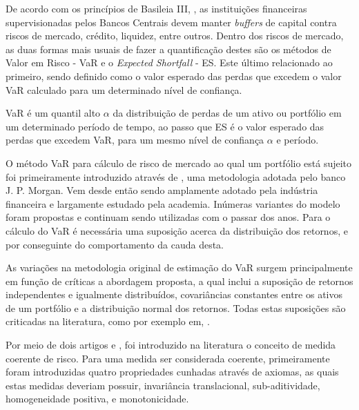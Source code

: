 \documentclass[1p]{elsarticle}
\theoremstyle{definition}
\begin{document}
De acordo com os princípios de Basileia III, \cite{BankingSupervision2011, BankingSupervision2013, BankingSupervision2014}, as instituições financeiras supervisionadas pelos Bancos Centrais devem manter \emph{buffers} de capital contra riscos de mercado, crédito, liquidez, entre outros. Dentro dos riscos de mercado, as duas formas mais usuais de fazer a quantificação destes são os métodos de Valor em Risco - VaR e o \emph{Expected Shortfall} - ES. Este último relacionado ao primeiro, sendo definido como o valor esperado das perdas que excedem o valor VaR calculado para um determinado nível de confiança.

VaR é um quantil alto $\alpha$ da distribuição de perdas de um ativo ou portfólio em um determinado período de tempo, ao passo que ES é o valor esperado das perdas que excedem VaR, para um mesmo nível de confiança $\alpha$ e período.

O método VaR para cálculo de risco de mercado ao qual um portfólio está sujeito foi primeiramente introduzido através de \cite{RiskMetrics1995}, uma metodologia adotada pelo banco J. P. Morgan. Vem desde então sendo amplamente adotado pela indústria financeira e largamente estudado pela academia. Inúmeras variantes do modelo foram propostas e continuam sendo utilizadas com o passar dos anos. Para o cálculo do VaR é necessária uma suposição acerca da distribuição dos retornos, e por conseguinte do comportamento da cauda desta.

As variações na metodologia original de estimação do VaR surgem principalmente em função de críticas a abordagem proposta, a qual inclui a suposição de retornos independentes e igualmente distribuídos, covariâncias constantes entre os ativos de um portfólio e a distribuição normal dos retornos. Todas estas suposições são criticadas na literatura, como por exemplo em, \cite{Campbell1997}.

Por meio de dois artigos \cite{Artzner1997} e \cite{Artzner1999}, foi introduzido na literatura o conceito de medida coerente de risco. Para uma medida ser considerada coerente, primeiramente foram introduzidas quatro propriedades cunhadas através de axiomas, as quais estas medidas deveriam possuir, invariância translacional,	sub-aditividade, homogeneidade positiva, e monotonicidade.
\end{document}
